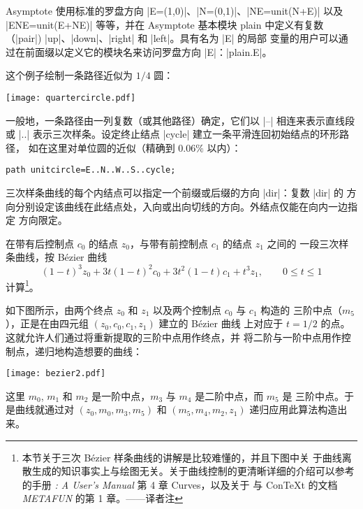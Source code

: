 \documentclass[nofonts,CJKnormalspaces]{ctexbook}[2009/05/20]
\let\leq\leqslant
\newcommand*\prgname[1]{\textsf{#1}}
\newcommand\transnote[1]{\footnote{#1——译者注}}
\begin{document}
\prgname{Asymptote} 使用标准的罗盘方向 |E=(1,0)|、|N=(0,1)|、|NE=unit(N+E)|
以及 |ENE=unit(E+NE)| 等等，并在 \prgname{Asymptote} 基本模块 \prgname{plain}
中定义有复数（|pair|) |up|、|down|、|right| 和 |left|。具有名为 |E| 的局部
变量的用户可以通过在前面缀以定义它的模块名来访问罗盘方向 |E|：|plain.E|。

这个例子绘制一条路径近似为 $1/4$ 圆：

\begin{center}
  \texttt{[image: quartercircle.pdf]}
\end{center}

一般地，一条路径由一列复数（或其他路径）确定，它们以 |--| 相连来表示直线段或
|..| 表示三次样条。设定终止结点 |cycle| 建立一条平滑连回初始结点的环形路径，
如在这里对单位圆的近似（精确到 $0.06\%$ 以内）：
\begin{lstlisting}
path unitcircle=E..N..W..S..cycle;
\end{lstlisting}

三次样条曲线的每个内结点可以指定一个前缀或后缀的方向 |{dir}|：复数 |dir| 的
方向分别设定该曲线在此结点处，入向或出向切线的方向。外结点仅能在向内一边指定
方向限定。

在带有后控制点 $c_0$ 的结点 $z_0$，与带有前控制点 $c_1$ 的结点 $z_1$ 之间的
一段三次样条曲线，按 Bézier 曲线
\begin{equation*}
  (1-t)^3 z_0 + 3t(1-t)^2 c_0 + 3t^2 (1-t) c_1 + t^3 z_1, \qquad 0\leq t\leq 1
\end{equation*}
计算\transnote{本节关于三次 Bézier 样条曲线的讲解是比较难懂的，并且下图中关
于曲线离散生成的知识事实上与绘图无关。关于曲线控制的更清晰详细的介绍可以参考
\MP{} 的手册 \textit{\MP{}: A User's Manual} 第 4 章 Curves，以及关于 \MP{} 
与 Con\TeX{}t 的文档 \textit{METAFUN} 的第 1 章。}。

如下图所示，由两个终点 $z_0$ 和 $z_1$ 以及两个控制点 $c_0$ 与 $c_1$ 构造的
三阶中点（$m_5$），正是在由四元组 $(z_0, c_0, c_1, z_1)$ 建立的 Bézier 曲线
上对应于 $t = 1/2$ 的点。这就允许人们通过将重新提取的三阶中点用作终点，并
将二阶与一阶中点用作控制点，递归地构造想要的曲线：
\begin{center}
  \texttt{[image: bezier2.pdf]}
\end{center}
这里 $m_0$, $m_1$ 和 $m_2$ 是一阶中点，$m_3$ 与 $m_4$ 是二阶中点，而 $m_5$ 是
三阶中点。于是曲线就通过对 $(z_0, m_0, m_3, m_5)$ 和 $(m_5, m_4, m_2, z_1)$
递归应用此算法构造出来。
\end{document}

